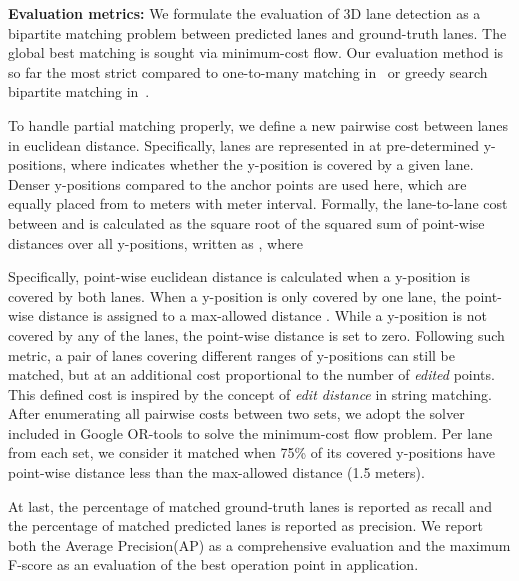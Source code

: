 \documentclass[10pt,twocolumn,letterpaper]{article}
\begin{document}
{\bf Evaluation metrics:} We formulate the evaluation of 3D lane detection as a bipartite matching problem between predicted lanes and ground-truth lanes. The global best matching is sought via minimum-cost flow. Our evaluation method is so far the most strict compared to one-to-many matching in~\cite{Tusimple2018} or greedy search bipartite matching in~\cite{Garnett:etal:ICCV2019}. 



To handle partial matching properly, we define a new pairwise cost between lanes in euclidean distance. Specifically, lanes are represented in  at  pre-determined y-positions, where  indicates whether the y-position is covered by a given lane. Denser y-positions compared to the anchor points are used here, which are equally placed from  to  meters with  meter interval. Formally, the lane-to-lane cost between  and  is calculated as the square root of the squared sum of point-wise distances over all y-positions, written as , where
{\small

}
Specifically, point-wise euclidean distance is calculated when a y-position is covered by both lanes. When a y-position is only covered by one lane, the point-wise distance is assigned to a max-allowed distance . While a y-position is not covered by any of the lanes, the point-wise distance is set to zero. Following such metric, a pair of lanes covering different ranges of y-positions can still be matched, but at an additional cost proportional to the number of \textit{edited} points. This defined cost is inspired by the concept of \textit{edit distance} in string matching. After enumerating all pairwise costs between two sets, we adopt the solver included in Google OR-tools to solve the minimum-cost flow problem. Per lane from each set, we consider it matched when 75\% of its covered y-positions have point-wise distance less than the max-allowed distance (1.5 meters).


At last, the percentage of matched ground-truth lanes is reported as recall and the percentage of matched predicted lanes is reported as precision. We report both the Average Precision(AP) as a comprehensive evaluation and the maximum F-score as an evaluation of the best operation point in application.

\begin{comment}
\begin{figure}[!h]
  \centering
  \texttt{[image: figs/illus\_eval.png]}
  \texttt{[image: figs/illus\_eval\_2.jpg]}
\caption{\textbf{Visualization of evaluation result.} We show two pairs of results, both in image and in 3D coordinates. The matching results are visualized in distinguished colors: the  matched  lane  lines  from prediction and ground-truth  are drawn in red and blue respectively; The false negative ground-truth lanes are shown in cyan, and false positive predicted lanes are shown in purple.}
  \label{fig:illus:eval}
\end{figure}
\end{comment}
\end{document}
